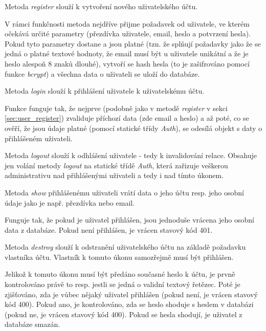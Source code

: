 			\label{sec:user_register}
			Metoda \textit{register} slouží k vytvoření nového uživatelského účtu.
			
			V rámci funkčnosti metoda nejdříve přijme požadavek od uživatele, ve kterém očekává určité parametry (přezdívka uživatele, email, heslo a potvrzení hesla). Pokud tyto parametry dostane a jsou platné (tzn. že splňují požadavky jako že se jedná o platné textové hodnoty, že email musí být u uživatele unikátní a že je heslo alespoň 8 znaků dlouhé), vytvoří se hash hesla (to je zašifrováno pomocí funkce \textit{bcrypt}) a všechna data o uživateli se uloží do databáze. 
			
			Metoda \textit{login} slouží k přihlášení uživatele k uživatelskému účtu. 
			
			Funkce funguje tak, že nejprve (podobně jako v metodě \textit{register} v sekci \ref{sec:user_register}) zvaliduje příchozí data (zde email a heslo) a až poté, co se ověří, že jsou údaje platné (pomocí statické třídy \textit{Auth}), se odesílá objekt s daty o přihlášeném uživateli.
			
			Metoda \textit{logout} slouží k odhlášení uživatele - tedy k invalidování relace. Obsahuje jen volání metody \textit{logout} na statické třídě \textit{Auth}, která zařizuje veškerou administrativu nad přihlášenými uživateli a tedy i nad tímto úkonem.
			
			Metoda \textit{show} přihlášenému uživateli vrátí data o jeho účtu resp. jeho osobní údaje jako je např. přezdívka nebo email.
			
			Funguje tak, že pokud je uživatel přihlášen, jsou jednoduše vrácena jeho osobní data z databáze. Pokud není přihlášen, je vrácen stavový kód 401.
			
			Metoda \textit{destroy} slouží k odstranění uživatelského účtu na základě požadavku vlastníka účtu. Vlastník k tomuto úkonu samozřejmě musí být přihlášen.
			
			Jelikož k tomuto úkonu musí být předáno současné heslo k účtu, je prvně kontrolováno právě to resp. jestli se jedná o validní textový řetězec. Poté je zjišťováno, zda je vůbec nějaký uživatel přihlášen (pokud není, je vrácen stavový kód 400). Pokud ano, je kontrolováno, zda se heslo shoduje s heslem v databázi (pokud ne, je vrácen stavový kód 400). Pokud se hesla shodují, je uživatel z databáze smazán.
			
